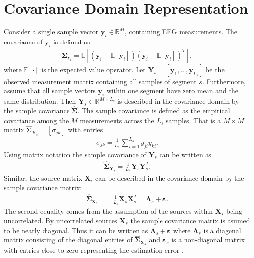 \section{Covariance Domain Representation}\label{sec:cov}
Consider a single sample vector $\textbf{y}_i\in \mathbb{R}^{M}$, containing EEG measurements. 
The covariance of $\textbf{y}_i$ is defined as
\begin{align*}
\boldsymbol{\Sigma}_{\textbf{y}_i}=\mathbb{E}[(\textbf{y}_i-\mathbb{E}[\textbf{y}_i])(\textbf{y}_i-\mathbb{E}[\textbf{y}_i])^T],
\end{align*}
where $\mathbb{E}[\cdot]$ is the expected value operator. 
Let $\textbf{Y}_{s}=\left[\textbf{y}_1, \hdots ,\textbf{y}_{L_s}\right]$ be the observed measurement matrix containing all samples of segment $s$.
Furthermore, assume that all sample vectors $\textbf{y}_i$ within one segment have zero mean and the same distribution.  
Then $\mathbf{Y}_s \in \mathbb{R}^{M \times L_s}$ is described in the covariance-domain by the sample covariance $\widehat{\boldsymbol{\Sigma}}$. The sample covariance is defined as the empirical covariance among the $M$ measurements across the $L_s$ samples. That is a $M \times M$ matrix $\widehat{\boldsymbol{\Sigma}}_{\mathbf{Y}_s} = [\sigma_{jk}]$ with entries 
\begin{align*}
\sigma_{jk}= \frac{1}{L_s}\sum_{i=1}^{L_s} y_{ji} y_{ki}.
\end{align*}
Using matrix notation the sample covariance of $\mathbf{Y}_s$ can be written as
\begin{align*}
\widehat{\boldsymbol{\Sigma}}_{\mathbf{Y}_s} = \frac{1}{L_s} \mathbf{Y}_s \mathbf{Y}_s^T.
\end{align*} 
Similar, the source matrix $\mathbf{X}_s$ can be described in the covariance domain by the sample covariance matrix:
\begin{align*}
\widehat{\boldsymbol{\Sigma}}_{\mathbf{X}_s} &= \frac{1}{L_s} \mathbf{X}_s \mathbf{X}_s^T = \boldsymbol{\Lambda}_s + \boldsymbol{\varepsilon}. 
\end{align*}
The second equality comes from the assumption of the sources within $\mathbf{X}_s$ being uncorrelated. By uncorrelated sources $\mathbf{X}_s$ the sample covariance matrix is asumed to be nearly diagonal. Thus it can be written as $\boldsymbol{\Lambda}_s + \boldsymbol{\varepsilon}$ where $\boldsymbol{\Lambda}_s$ is a diagonal matrix consisting of the diagonal entries of $\widehat{\boldsymbol{\Sigma}}_{\mathbf{X}_s}$ and $ \boldsymbol{\varepsilon}_s$ is a non-diagonal matrix with entries close to zero representing the estimation error \cite{Balkan2015}.

